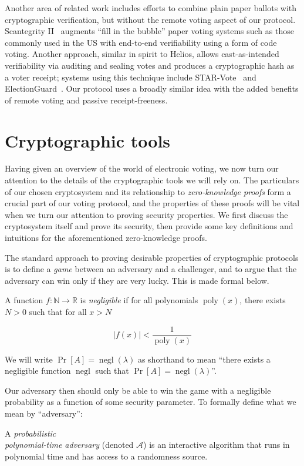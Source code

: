 \documentclass[12pt,a4paper]{article}
\DeclareMathOperator{\poly}{\text{poly}}
\DeclareMathOperator{\negl}{\text{negl}}
\theoremstyle{definition}
\begin{document}
Another area of related work includes efforts to combine plain paper ballots with cryptographic verification, but without the remote voting aspect of our protocol. Scantegrity II~\cite{chaum2008scantegrity} augments ``fill in the bubble'' paper voting systems such as those commonly used in the US with end-to-end verifiability using a form of code voting. Another approach, similar in spirit to Helios, allows cast-as-intended verifiability via auditing and sealing votes and produces a cryptographic hash as a voter receipt; systems using this technique include STAR-Vote~\cite{bell2013star} and ElectionGuard~\cite{electionguard}. Our protocol uses a broadly similar idea with the added benefits of remote voting and passive receipt-freeness.

\section{Cryptographic tools}\label{sec-crypto}
Having given an overview of the world of electronic voting, we now turn our attention to the details of the cryptographic tools we will rely on. The particulars of our chosen cryptosystem and its relationship to \textit{zero-knowledge proofs} form a crucial part of our voting protocol, and the properties of these proofs will be vital when we turn our attention to proving security properties. We first discuss the cryptosystem itself and prove its security, then provide some key definitions and intuitions for the aforementioned zero-knowledge proofs.

The standard approach to proving desirable properties of cryptographic protocols is to define a \textit{game} between an adversary and a challenger, and to argue that the adversary can win only if they are very lucky. This is made formal below.
\begin{definition}
    A function $f:\mathbb{N}\rightarrow\mathbb{R}$ is \textit{negligible} if for all polynomials $\poly(x)$, there exists $N>0$ such that for all $x>N$

    $$|f(x)|<\frac{1}{\poly(x)}$$

    We will write $\Pr[A]=\negl(\lambda)$ as shorthand to mean ``there exists a negligible function $\negl$ such that $\Pr[A]=\negl(\lambda)$''.
\end{definition}

Our adversary then should only be able to win the game with a negligible probability as a function of some security parameter. To formally define what we mean by ``adversary'':
\begin{definition}
    A \textit{probabilistic}\\\textit{polynomial-time adversary} (denoted $\mathcal{A}$) is an interactive algorithm that runs in polynomial time and has access to a randomness source.
\end{definition}
\end{document}
